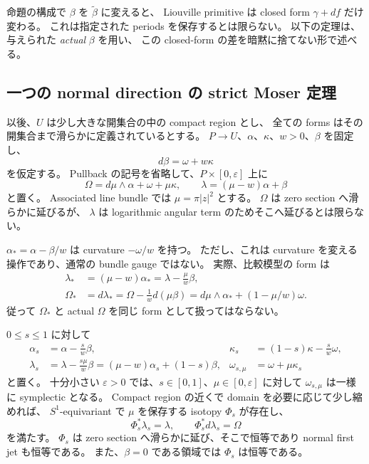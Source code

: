 \begin{remark}
命題の構成で $\beta$ を $\widetilde\beta$ に変えると、
Liouville primitive は closed form $\gamma+df$ だけ変わる。
これは指定された periods を保存するとは限らない。
以下の定理は、与えられた \emph{actual} $\beta$ を用い、
この closed-form の差を暗黙に捨てない形で述べる。
\end{remark}

\subsection{一つの normal direction の strict Moser 定理}
\label{mc:single}

以後、$U$ は少し大きな開集合の中の compact region とし、
全ての forms はその開集合まで滑らかに定義されているとする。
$P\to U$、$\alpha$、$\kappa$、$w>0$、$\beta$ を固定し、
\begin{equation}
 d\beta=\omega+w\kappa
 \label{mc:primitive}
\end{equation}
を仮定する。
Pullback の記号を省略して、$P\times[0,\varepsilon]$ 上に
\begin{equation}
 \Omega=d\mu\wedge\alpha+\omega+\mu\kappa,
 \qquad \lambda=(\mu-w)\alpha+\beta
 \label{mc:original}
\end{equation}
と置く。
Associated line bundle では $\mu=\pi|z|^2$ とする。
$\Omega$ は zero section へ滑らかに延びるが、
$\lambda$ は logarithmic angular term のためそこへ延びるとは限らない。

$\alpha_* =\alpha-\beta/w$ は curvature $-\omega/w$ を持つ。
ただし、これは curvature を変える操作であり、通常の bundle gauge ではない。
実際、比較模型の form は
\begin{align}
 \lambda_*&=(\mu-w)\alpha_* =\lambda-\frac{\mu}{w}\beta,\label{mc:lambda-target}\\
 \Omega_*&=d\lambda_*
 =\Omega-\frac1w d(\mu\beta)
 =d\mu\wedge\alpha_*+(1-\mu/w)\omega.\label{mc:omega-target}
\end{align}
従って $\Omega_*$ と actual $\Omega$ を同じ form として扱ってはならない。

\begin{theorem}
\label{mc:strict-moser}
$0\le s\le1$ に対して
\begin{align*}
 \alpha_s&=\alpha-\frac{s}{w}\beta,
 &\kappa_s&=(1-s)\kappa-\frac{s}{w}\omega,\\
 \lambda_s&=\lambda-\frac{s\mu}{w}\beta
            =(\mu-w)\alpha_s+(1-s)\beta,
 &\omega_{s,\mu}&=\omega+\mu\kappa_s
\end{align*}
と置く。
十分小さい $\varepsilon>0$ では、$s\in[0,1]$、$\mu\in[0,\varepsilon]$ に対して
$\omega_{s,\mu}$ は一様に symplectic となる。
Compact region の近くで domain を必要に応じて少し縮めれば、
$S^1$-equivariant で $\mu$ を保存する isotopy $\Phi_s$ が存在し、
\begin{equation}
 \Phi_s^*\lambda_s=\lambda,
 \qquad \Phi_s^*d\lambda_s=\Omega
 \label{mc:strict}
\end{equation}
を満たす。
$\Phi_s$ は zero section へ滑らかに延び、そこで恒等であり normal first jet も恒等である。
また、$\beta=0$ である領域では $\Phi_s$ は恒等である。
\end{theorem}

